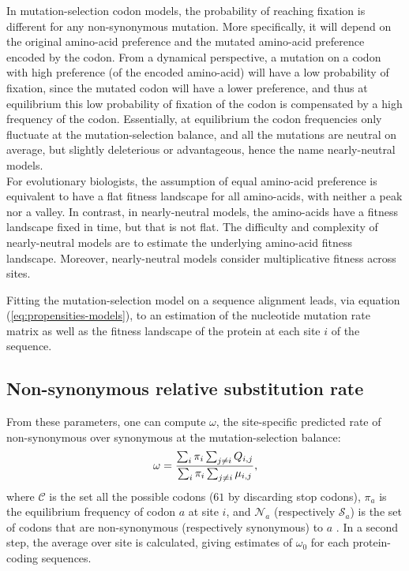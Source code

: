 In mutation-selection \gls{codon} models, the probability of reaching fixation is different for any non-synonymous mutation.
More specifically, it will depend on the original amino-acid preference and the mutated amino-acid preference encoded by the \gls{codon}.
From a dynamical perspective, a mutation on a \gls{codon} with high preference (of the encoded amino-acid) will have a low probability of fixation, since the mutated \gls{codon} will have a lower preference, and thus at equilibrium this low probability of fixation of the \gls{codon} is compensated by a high frequency of the \gls{codon}.
Essentially, at equilibrium the \gls{codon} frequencies only fluctuate at the mutation-selection balance, and all the mutations are \gls{neutral} on average, but slightly deleterious or advantageous, hence the name \gls{nearly-neutral} models.\\
For evolutionary biologists, the assumption of equal amino-acid preference is equivalent to have a flat fitness landscape for all amino-acids, with neither a peak nor a valley.
In contrast, in \gls{nearly-neutral} models, the amino-acids have a fitness landscape fixed in time, but that is not flat.
The difficulty and complexity of \gls{nearly-neutral} models are to estimate the underlying amino-acid fitness landscape.
Moreover, \gls{nearly-neutral} models consider multiplicative fitness across sites.


Fitting the mutation-selection model on a sequence alignment leads, via equation (\ref{eq:propensities-models}), to an estimation of the nucleotide mutation rate matrix as well as the fitness landscape of the protein at each site $i$ of the sequence. 

\subsection{Non-synonymous relative {substitution} rate}
From these parameters, one can compute $\omega$, the site-specific predicted rate of non-synonymous over \gls{synonymous} at the mutation-selection balance: 
\begin{equation}
\omega = \dfrac{ \sum_{i} \pi_{i} \sum_{j \neq i } Q_{{i}, {j}}}{\sum_{i} \pi_{i} \sum_{j \neq i } \mu_{{i}, {j}}},
\end{equation}
where $\mathcal{C}$ is the set all the possible codons ($61$ by discarding stop codons), $\pi_a$ is the equilibrium frequency of \gls{codon} $a$ at site $i$, and $\mathcal{N}_a$ (respectively $\mathcal{S}_a$) is the set of codons that are non-synonymous (respectively synonymous) to $a$ \citep{spielman_relationship_2015, rodrigue_site-heterogeneous_2014}. In a second step, the average over site is calculated, giving estimates of $\omega_0$ for each protein-coding sequences. \\

